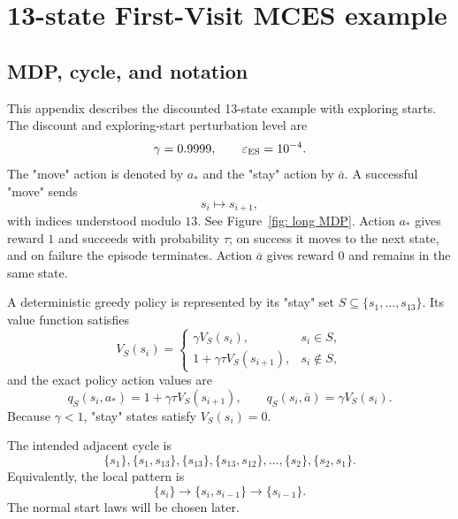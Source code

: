 
\newcommand{\astar}{a_*}
\newcommand{\abar}{\bar a}
\newcommand{\epsES}{\varepsilon_{\rm ES}}
\newcommand{\qhat}{\widehat q}
\newcommand{\calZ}{\mathcal Z}
\newcommand{\calS}{\mathcal S}

\section{13-state First-Visit MCES example}
\label{app:fv}

\subsection{MDP, cycle, and notation}

This appendix describes the discounted 13-state example with 
exploring starts.  The discount and exploring-start perturbation level are
\begin{equation*}
    \gamma=0.9999,
    \qquad
    \epsES=10^{-4}.
\end{equation*}
The "move" action is denoted by $\astar$ and the "stay" action by $\abar$.
A successful "move" sends
\begin{equation*}
    s_i\longmapsto s_{i+1},
\end{equation*}
with indices understood modulo $13$.  See Figure~\ref{fig: long MDP}.
Action $\astar$ gives reward $1$ and succeeds with probability $\tau$; on success it moves to the next state, and on failure the episode terminates.  Action $\abar$ gives reward $0$ and remains in the same state.

A deterministic greedy policy is represented by its "stay" set $S\subseteq\{s_1,\ldots,s_{13}\}$.  Its value function satisfies
\begin{equation*}
V_S(s_i)=
\begin{cases}
\gamma V_S(s_i), & s_i\in S,\\[1mm]
1+\gamma\tau V_S(s_{i+1}), & s_i\notin S,
\end{cases}
\end{equation*}
and the exact policy action values are
\begin{equation*}
q_S(s_i,\astar)=1+\gamma\tau V_S(s_{i+1}),
\qquad
q_S(s_i,\abar)=\gamma V_S(s_i).
\end{equation*}
Because $\gamma<1$, "stay" states satisfy $V_S(s_i)=0$.

The intended adjacent cycle is
\begin{equation}
\label{eq:intended-cycle}
\{s_1\},\{s_1,s_{13}\},\{s_{13}\},\{s_{13},s_{12}\},\ldots,
\{s_2\},\{s_2,s_1\}.
\end{equation}
Equivalently, the local pattern is
\begin{equation*}
    \{s_i\}\longrightarrow \{s_i,s_{i-1}\}\longrightarrow \{s_{i-1}\}.
\end{equation*}
The normal start laws will be chosen later.

